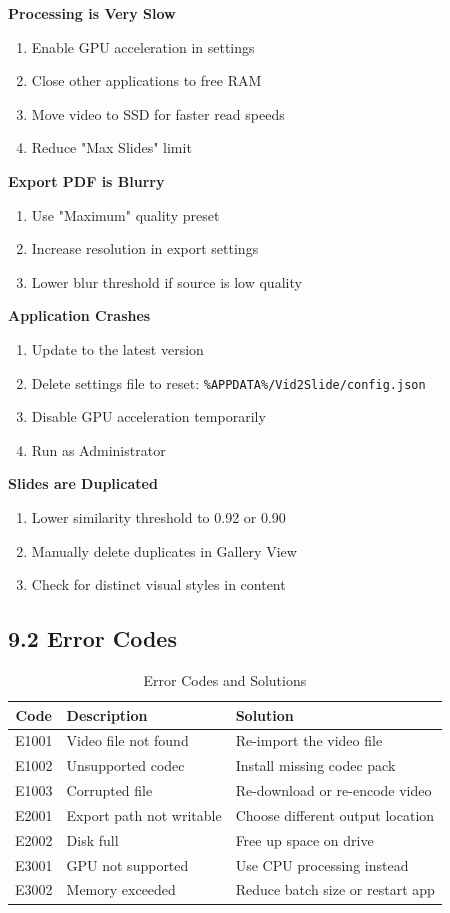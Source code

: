 \documentclass[12pt,a4paper]{article}
\newcommand{\subsectionTitle}[1]{\subsection*{#1}}
\newcommand{\code}[1]{\texttt{#1}}
\begin{document}
\textbf{Processing is Very Slow}
\begin{enumerate}
    \item Enable GPU acceleration in settings
    \item Close other applications to free RAM
    \item Move video to SSD for faster read speeds
    \item Reduce "Max Slides" limit
\end{enumerate}

\textbf{Export PDF is Blurry}
\begin{enumerate}
    \item Use "Maximum" quality preset
    \item Increase resolution in export settings
    \item Lower blur threshold if source is low quality
\end{enumerate}

\textbf{Application Crashes}
\begin{enumerate}
    \item Update to the latest version
    \item Delete settings file to reset: \code{\%APPDATA\%/Vid2Slide/config.json}
    \item Disable GPU acceleration temporarily
    \item Run as Administrator
\end{enumerate}

\textbf{Slides are Duplicated}
\begin{enumerate}
    \item Lower similarity threshold to 0.92 or 0.90
    \item Manually delete duplicates in Gallery View
    \item Check for distinct visual styles in content
\end{enumerate}

\subsectionTitle{9.2 Error Codes}

\begin{table}[H]
    \centering
    \caption{Error Codes and Solutions}
    \begin{tabular}{clp{6cm}}
        \toprule
        \textbf{Code} & \textbf{Description} & \textbf{Solution} \\
        \midrule
        E1001 & Video file not found & Re-import the video file \\
        E1002 & Unsupported codec & Install missing codec pack \\
        E1003 & Corrupted file & Re-download or re-encode video \\
        E2001 & Export path not writable & Choose different output location \\
        E2002 & Disk full & Free up space on drive \\
        E3001 & GPU not supported & Use CPU processing instead \\
        E3002 & Memory exceeded & Reduce batch size or restart app \\
        \bottomrule
    \end{tabular}
\end{table}
\end{document}
